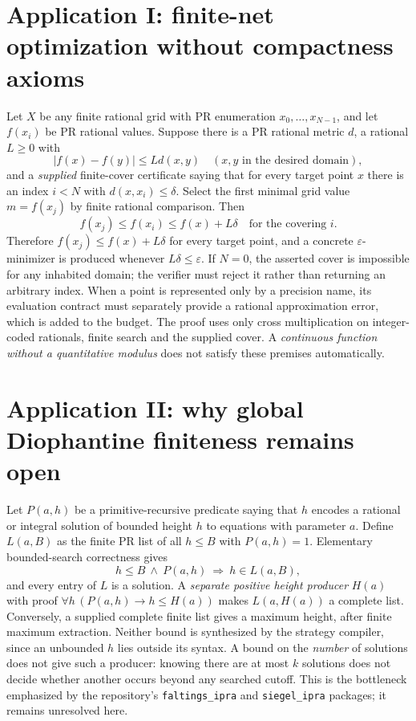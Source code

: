 \documentclass[11pt]{article}
\begin{document}
\section{Application I: finite-net optimization without compactness axioms}
Let $X$ be any finite rational grid with PR enumeration $x_0,\dots,x_{N-1}$, and let $f(x_i)$ be PR rational values. Suppose there is a PR rational metric $d$, a rational $L\ge0$ with
\[|f(x)-f(y)|\le Ld(x,y)\quad(x,y\text{ in the desired domain}),\]
and a \emph{supplied} finite-cover certificate saying that for every target point $x$ there is an index $i<N$ with $d(x,x_i)\le\delta$. Select the first minimal grid value $m=f(x_j)$ by finite rational comparison. Then
\[f(x_j)\le f(x_i)\le f(x)+L\delta\quad\text{for the covering }i.\]
Therefore $f(x_j)\le f(x)+L\delta$ for every target point, and a concrete $\varepsilon$-minimizer is produced whenever $L\delta\le\varepsilon$. If $N=0$, the asserted cover is impossible for any inhabited domain; the verifier must reject it rather than returning an arbitrary index. When a point is represented only by a precision name, its evaluation contract must separately provide a rational approximation error, which is added to the budget. The proof uses only cross multiplication on integer-coded rationals, finite search and the supplied cover. A \emph{continuous function without a quantitative modulus} does not satisfy these premises automatically.

\section{Application II: why global Diophantine finiteness remains open}
Let $P(a,h)$ be a primitive-recursive predicate saying that $h$ encodes a rational or integral solution of bounded height $h$ to equations with parameter $a$. Define $L(a,B)$ as the finite PR list of all $h\le B$ with $P(a,h)=1$. Elementary bounded-search correctness gives
\[h\le B\ \wedge\ P(a,h)\ \Rightarrow\ h\in L(a,B),\]
and every entry of $L$ is a solution. A \emph{separate positive height producer} $H(a)$ with proof $\forall h\,(P(a,h)\to h\le H(a))$ makes $L(a,H(a))$ a complete list. Conversely, a supplied complete finite list gives a maximum height, after finite maximum extraction. Neither bound is synthesized by the strategy compiler, since an unbounded $h$ lies outside its syntax. A bound on the \emph{number} of solutions does not give such a producer: knowing there are at most $k$ solutions does not decide whether another occurs beyond any searched cutoff. This is the bottleneck emphasized by the repository's \texttt{faltings\_ipra} and \texttt{siegel\_ipra} packages; it remains unresolved here.
\end{document}
